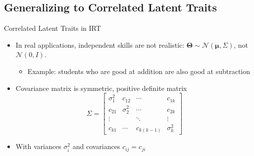 \documentclass{beamer}
\newcommand{\vect}[1]{\boldsymbol{#1}}
\theoremstyle{definition}
\let\oldfootnotesize\footnotesize
\renewcommand*{\footnotesize}{\oldfootnotesize\tiny}
\begin{document}
%


\subsection{Generalizing to Correlated Latent Traits}

\begin{frame}{Correlated Latent Traits in IRT}
\begin{itemize}
  \item In real applications, independent skills are not realistic: $\vect \Theta \sim \mathcal{N}(\vect \mu, \Sigma)$, not $\mathcal{N}(0,I)$.
  \begin{itemize}
    \item Example: students who are good at addition are also good at subtraction
  \end{itemize}
  \item<2-> Covariance matrix is symmetric, positive definite matrix
  \[\Sigma = \begin{bmatrix}
  \sigma_1^2 & c_{12} & \cdots & c_{1k} \\
  c_{21} & \sigma_2^2 & \cdots & c_{2k} \\
  \vdots & & \ddots & \vdots \\
  c_{k1} & \cdots & c_{k(k-1)} & \sigma_k^2
  \end{bmatrix}\]
  \item<2-> With variances $\sigma_i^2$ and covariances $c_{ij} = c_{ji}$
\end{itemize}
\end{frame}
\end{document}
